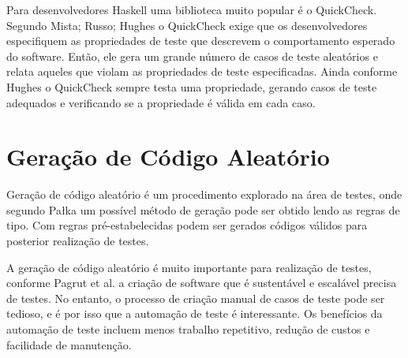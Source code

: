 Para desenvolvedores Haskell uma biblioteca muito popular é o QuickCheck. Segundo Mista; Russo; Hughes \cite{mista2018} o QuickCheck exige que os desenvolvedores especifiquem as propriedades de teste que descrevem o comportamento esperado do software. Então, ele gera um grande número de casos de teste aleatórios e relata aqueles que violam as propriedades de teste especificadas. Ainda conforme Hughes \cite{hughes2016} o QuickCheck sempre testa uma propriedade, gerando casos de teste adequados e verificando se a propriedade é válida em cada caso.

\section{Geração de Código Aleatório}
Geração de código aleatório é um procedimento explorado na área de testes, onde segundo Pałka \cite{palka2011} um possível método de geração pode ser obtido lendo as regras de tipo. Com regras pré-estabelecidas podem ser gerados códigos válidos para posterior realização de testes.

A geração de código aleatório é muito importante para realização de testes, conforme Pagrut et al. \cite{pagrut2018} a criação de software que é sustentável e escalável precisa de testes. No entanto, o processo de criação manual de casos de teste pode ser tedioso, e é por isso que a automação de teste é interessante. Os benefícios da automação de teste incluem menos trabalho repetitivo, redução de custos e facilidade de manutenção.

